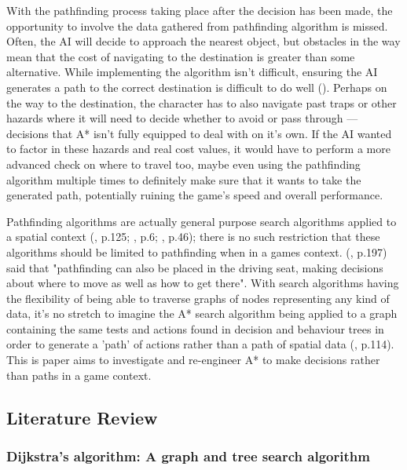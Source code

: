 \documentclass[11pt, a4paper]{article}
\begin{document}
With the pathfinding process taking place after the decision has been made, the opportunity to involve the data gathered from pathfinding algorithm is missed. Often, the AI will decide to approach the nearest object, but obstacles in the way mean that the cost of navigating to the destination is greater than some alternative. While implementing the algorithm isn't difficult, ensuring the AI generates a path to the correct destination is difficult to do well (\cite{forbus2002qualitative}). Perhaps on the way to the destination, the character has to also navigate past traps or other hazards where it will need to decide whether to avoid or pass through --- decisions that A* isn't fully equipped to deal with on it's own. If the AI wanted to factor in these hazards and real cost values, it would have to perform a more advanced check on where to travel too, maybe even using the pathfinding algorithm multiple times to definitely make sure that it wants to take the generated path, potentially ruining the game's speed and overall performance.

Pathfinding algorithms are actually general purpose search algorithms applied to a spatial context (\cite{cui2011based}, p.125; \cite{orkin2003applying}, p.6; \cite{yap2002grid}, p.46); there is no such restriction that these algorithms should be limited to pathfinding when in a games context. \citeauthor{millington2019ai} (\citeyear{millington2019ai}, p.197) said that "pathfinding can also be placed in the driving seat, making decisions about where to move as well as how to get there". With search algorithms having the flexibility of being able to traverse graphs of nodes representing any kind of data, it's no stretch to imagine the A* search algorithm being applied to a graph containing the same tests and actions found in decision and behaviour trees in order to generate a 'path' of actions rather than a path of spatial data (\cite{higgins2002generic}, p.114). This is paper aims to investigate and re-engineer A* to make decisions rather than paths in a game context.

\subsection{Literature Review}

\subsubsection{Dijkstra's algorithm: A graph and tree search algorithm}
\end{document}
